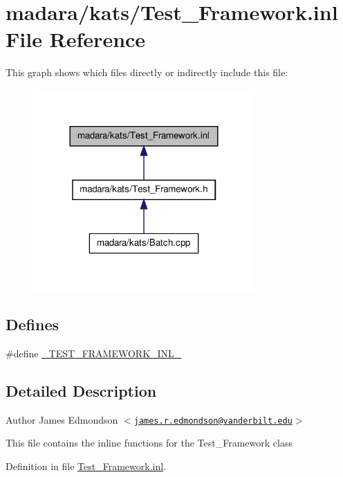 \hypertarget{Test__Framework_8inl}{
\section{madara/kats/Test\_\-Framework.inl File Reference}
\label{d8/dca/Test__Framework_8inl}
}
This graph shows which files directly or indirectly include this file:
\nopagebreak
\begin{figure}[H]
\begin{center}
\leavevmode
\includegraphics[width=240pt]{d3/df2/Test__Framework_8inl__dep__incl}
\end{center}
\end{figure}
\subsection*{Defines}
\begin{DoxyCompactItemize}
\item 
\#define \hyperlink{Test__Framework_8inl_afc3cbb786f84afe13bc46da7b92f9050}{\_\-TEST\_\-FRAMEWORK\_\-INL\_\-}
\end{DoxyCompactItemize}


\subsection{Detailed Description}
\begin{DoxyAuthor}{Author}
James Edmondson $<$\href{mailto:james.r.edmondson@vanderbilt.edu}{\tt james.r.edmondson@vanderbilt.edu}$>$
\end{DoxyAuthor}
This file contains the inline functions for the Test\_\-Framework class 

Definition in file \hyperlink{Test__Framework_8inl_source}{Test\_\-Framework.inl}.



